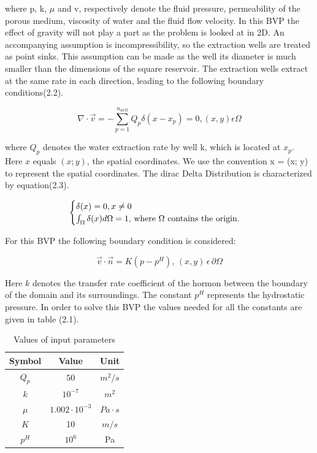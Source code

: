 \documentclass[a4paper]{report}
\begin{document}
where p, k, $\mu$ and v, respectively denote the 
fluid pressure, permeability of the porous medium, viscosity of water and the fluid flow velocity. In this BVP the effect of gravity will not play a part as the problem is looked at in 2D. An accompanying assumption is incompressibility, so the extraction wells are treated as point sinks. This assumption can be made as the well its diameter is much smaller than the dimensions of the square reservoir. The extraction wells extract at the same rate in each direction, leading to the following boundary conditions(2.2).


\begin{equation}
	\nabla\cdot\vec{v}=-\sum_{p=1}^{n_{well}}Q_p\delta(x-x_p)=0,(x,y) \epsilon\Omega 
\end{equation}

where $Q_p$ denotes the water extraction rate by well k, which is located at $x_p$. Here $x$ equals $(x;y)$, the spatial coordinates.  We use the convention x = (x; y) to represent the spatial coordinates. The dirac Delta Distribution is characterized by equation(2.3).

\begin{equation}
	\begin{cases} 
		\delta(x) = 0,x \neq 0 \\ \int_{\Omega}\delta(x)d\Omega = 1,$  where $\Omega $  contains the origin.$
	\end{cases} 
\end{equation}

\medskip

For this BVP the following boundary condition is considered: 

\begin{equation}
	\vec{v}\cdot\vec{n}=K(p-p^H), \, (x,y)\, \epsilon\,  \partial\Omega
\end{equation}
\bigskip

Here $k$ denotes the transfer rate coefficient of the hormon between the boundary of the domain and its surroundings. The constant $p^H$ represents the hydrostatic pressure. In order to solve this BVP the values needed for all the constants are given in table (2.1).


\begin{table}[ht]
	\caption{Values of input parameters} %
	\centering %
	\begin{tabular}{c c c} %
		\hline\hline %
		Symbol & Value & Unit\\ [0.5ex] %
		\hline %
		$Q_p$ & $50$ & $m^2/s$ \\ %
		$k$ & $10^{-7}$ & $m^2$ \\
		$\mu$ & $1.002\cdot 10^{-3}$ & $Pa\cdot s$ \\
		$K$ & 10 & $m/s$ \\
		$p^H$ & $10^6$ & Pa \\ [1ex] %
		\hline %
	\end{tabular}
	\label{table:nonlin} %
\end{table}
\bigskip
\end{document}
